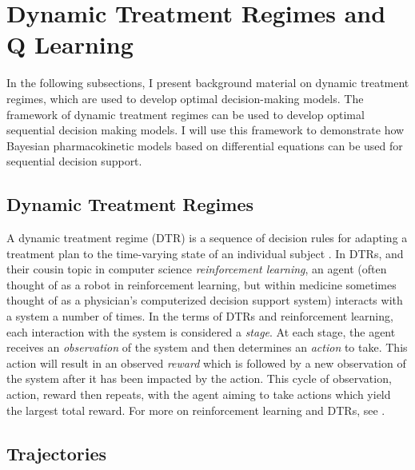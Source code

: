 \section{Dynamic Treatment Regimes and Q Learning}



In the following subsections, I present background material on dynamic treatment regimes, which are used to develop optimal decision-making models.  The framework of dynamic treatment regimes can be used to develop optimal sequential decision making models.  I will use this framework to demonstrate how Bayesian pharmacokinetic models based on differential equations can be used for sequential decision support.

\subsection{Dynamic Treatment Regimes}


A dynamic treatment regime (DTR) is a sequence of decision rules for adapting a treatment plan to the time-varying state of an individual subject \cite{chakraborty2013statistical}. In DTRs, and their cousin topic in computer science \textit{reinforcement learning}, an agent (often thought of as a robot in reinforcement learning, but within medicine sometimes thought of as a physician’s computerized decision support system) interacts with a system a number of times. In the terms of DTRs and reinforcement learning, each interaction with the system is considered a \textit{stage}.  At each stage, the agent receives an \textit{observation} of the system and then determines an \textit{action} to take. This action will result in an observed \textit{reward} which is followed by a new observation of the system after it has been impacted by the action.  This cycle of observation, action, reward then repeats, with the agent aiming to take actions which yield the largest total reward. For more on reinforcement learning and DTRs, see \cite{lizotte17reinforcement, chakraborty2013statistical}.

\subsection{Trajectories}


